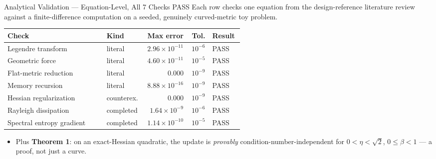 \documentclass[aspectratio=169,11pt]{beamer}
\begin{document}
\begin{frame}{Analytical Validation --- Equation-Level, All 7 Checks PASS}
  \footnotesize
  Each row checks one equation from the design-reference literature review against a
  finite-difference computation on a seeded, genuinely curved-metric toy problem.
  \vspace{0.3em}

  \scriptsize
  \begin{tabular}{@{}p{0.42\linewidth}p{0.13\linewidth}rrl@{}}
    \toprule
    Check & Kind & Max error & Tol. & Result \\
    \midrule
    Legendre transform & literal & $2.96\times10^{-11}$ & $10^{-6}$ & \alert{PASS} \\
    Geometric force & literal & $4.60\times10^{-11}$ & $10^{-5}$ & \alert{PASS} \\
    Flat-metric reduction & literal & $0.000$ & $10^{-9}$ & \alert{PASS} \\
    Memory recursion & literal & $8.88\times10^{-16}$ & $10^{-9}$ & \alert{PASS} \\
    Hessian regularization & counterex. & $0.000$ & $10^{-9}$ & \alert{PASS} \\
    Rayleigh dissipation & completed & $1.64\times10^{-9}$ & $10^{-6}$ & \alert{PASS} \\
    Spectral entropy gradient & completed & $1.14\times10^{-10}$ & $10^{-5}$ & \alert{PASS} \\
    \bottomrule
  \end{tabular}
  \vspace{0.5em}
  \begin{itemize}
    \item Plus \textbf{Theorem 1}: on an exact-Hessian quadratic, the update is
      \emph{provably} condition-number-independent for $0<\eta<\sqrt2$, $0\le\beta<1$ ---
      a proof, not just a curve.
  \end{itemize}
\end{frame}
\end{document}
